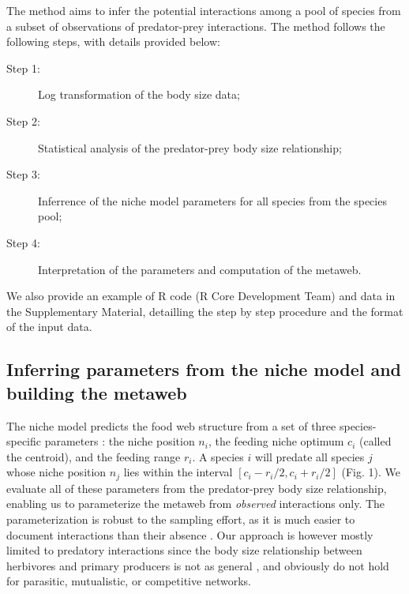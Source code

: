 \documentclass[12pt]{article}
\begin{document}
The method aims to infer the potential interactions among a pool of species from
a subset of observations of predator-prey interactions. The method follows the
following steps, with details provided below:
\begin{description}
\item[Step 1:] Log transformation of the body size data;
\item[Step 2:] Statistical analysis of the predator-prey body size relationship;
\item[Step 3:] Inferrence of the niche model parameters for all species from the species pool;
\item[Step 4:] Interpretation of the parameters and computation of the metaweb.
\end{description}
We also provide an example of R code (R Core Development Team) and data in the Supplementary Material, detailling the step by step procedure and the format of the input data. 

\subsection{Inferring parameters from the niche model and building the metaweb}

The niche model predicts the food web structure from a set of three
species-specific parameters \parencite{Williams2000}: the niche position $n_i$,
the feeding niche optimum $c_i$ (called the centroid), and the feeding range
$r_i$. A species $i$ will predate all species $j$ whose niche position $n_j$
lies within the interval $[c_i-r_i/2,c_i+r_i/2]$ (Fig. 1). We evaluate all of
these parameters from the predator-prey body size relationship, enabling us to
parameterize the metaweb from \emph{observed} interactions only. The
parameterization is robust to the sampling effort, as it is much easier to
document interactions than their absence \parencite{Martinez1999}. Our approach
is however mostly limited to predatory interactions since the body size
relationship between herbivores and primary producers is not as general
\parencite{Riede2010}, and obviously do not hold for parasitic, mutualistic, or
competitive networks.
\end{document}
